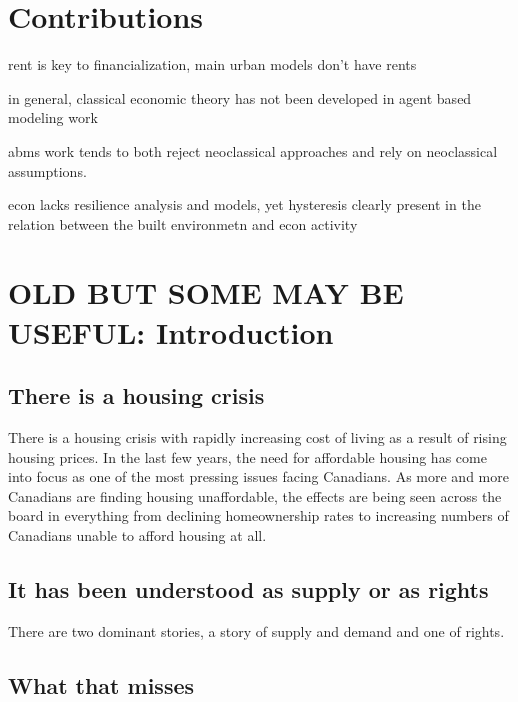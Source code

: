 
\section{Contributions}

rent is key to financialization, main urban models don't  have rents

in general, classical economic theory has not been developed in agent based modeling work

abms work tends to both reject neoclassical approaches and rely on neoclassical assumptions.

econ lacks resilience analysis and models, yet hysteresis clearly present in the relation between the built environmetn and econ activity




\section{OLD BUT SOME MAY BE USEFUL: Introduction}


\subsection{There is a housing crisis}  %
There is a housing crisis with rapidly increasing cost of living as a result of rising housing prices. 
In the last few years, the need for affordable housing has come into focus as one of the most pressing issues facing Canadians. As more and more Canadians are finding housing unaffordable, the effects are being seen across the board in everything from declining homeownership rates to increasing numbers of Canadians unable to afford housing at all.

\subsection{It has been understood as supply or as rights}

There are two dominant stories, a story of supply and demand and one of rights.

\subsection{What that misses}

